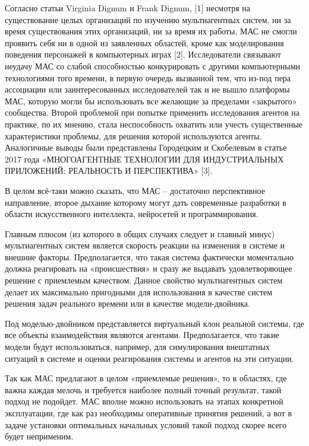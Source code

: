 Согласно статьи Virginia Dignum и Frank Dignum, [1] несмотря на существование целых организаций по изучению мультиагентных систем, ни за время существования этих организаций, ни за время их работы, МАС не смогли проявить себя ни в одной из заявленных областей, кроме как моделирования поведения персонажей в компьютерных играх [2]. Исследователи связывают неудачу МАС со слабой способностью конкурировать с другими компьютерными технологиями того времени, в первую очередь вызванной тем, что из-под пера ассоциации или заинтересованных исследователей так и не вышло платформы МАС, которую могли бы использовать все желающие за пределами «закрытого» сообщества. Второй проблемой при попытке применить исследования агентов на практике, по их мнению, стала неспособность охватить или учесть существенные характеристики проблемы, для решения которой используются агенты. Аналогичные выводы были представлены Городецким и Скобелевым в статье 2017 года «МНОГОАГЕНТНЫЕ ТЕХНОЛОГИИ ДЛЯ ИНДУСТРИАЛЬНЫХ ПРИЛОЖЕНИЙ: РЕАЛЬНОСТЬ И ПЕРСПЕКТИВА» [3].

В целом всё-таки можно сказать, что МАС – достаточно перспективное направление, второе дыхание которому могут дать современные разработки в области искусственного интеллекта, нейросетей и программирования.

Главным плюсом (из которого в общих случаях следует и главный минус) мультиагентных систем является скорость реакции на изменения в системе и внешние факторы. Предполагается, что такая система фактически моментально должна реагировать на «происшествия» и сразу же выдавать удовлетворяющее решение с приемлемым качеством. Данное свойство мультиагентных систем делает их максимально пригодными для использования в качестве систем решения задач реального времени или в качестве модели-двойника.

Под моделью-двойником представляется виртуальный клон реальной системы, где все объекты взаимодействия являются агентами. Предполагается, что такие модели будут использоваться, например, для симулирования внештатных ситуаций в системе и оценки реагирования системы и агентов на эти ситуации. 

Так как МАС предлагают в целом «приемлемые решения», то в областях, где важна каждая мелочь и требуется наиболее полный точный результат, такой подход не подойдет. МАС вполне можно использовать на этапах конкретной эксплуатации, где как раз необходимы оперативные принятия решений, а вот в задаче установки оптимальных начальных условий такой подход скорее всего будет неприменим.

